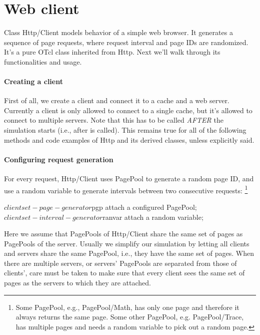 \section{Web client}
\label{sec:webcache-client}

Class Http/Client models behavior of a simple web browser. It
generates a sequence of page requests, where request interval and page 
IDs are randomized. It's a pure OTcl class inherited from Http. 
Next we'll walk through its functionalities and usage.

\paragraph{Creating a client}

First of all, we create a client and connect it to a cache and a web server.
Currently a client is only allowed to connect to a single cache, but it's 
allowed to connect to multiple servers. Note that this has to be called 
\emph{AFTER} the simulation starts (i.e., after  %
is called).
This remains true for all of the following methods and code examples of 
Http and its derived classes, unless explicitly said.


\paragraph{Configuring request generation}

For every request, Http/Client uses PagePool to generate a random page
ID, and use a random variable to generate intervals between two 
consecutive requests:
\footnote{Some PagePool,
e.g., PagePool/Math, has only one page and therefore it always returns the
same page. Some other PagePool, e.g. PagePool/Trace, has multiple pages 
and needs a random variable to pick out a random page.} 

\begin{program}
        $client set-page-generator $pgp \; attach a configured PagePool;
        $client set-interval-generator $ranvar \; attach a random variable;
\end{program}

Here we assume that PagePools of Http/Client share the same set of pages
as PagePools of the server. Usually we simplify our simulation by letting
all clients and servers share the same PagePool, i.e., they have the same
set of pages. When there are multiple servers, or servers' PagePools 
are separated from those of clients', care must be taken to make sure that 
every client sees the same set of pages as the servers to which they are
attached.

